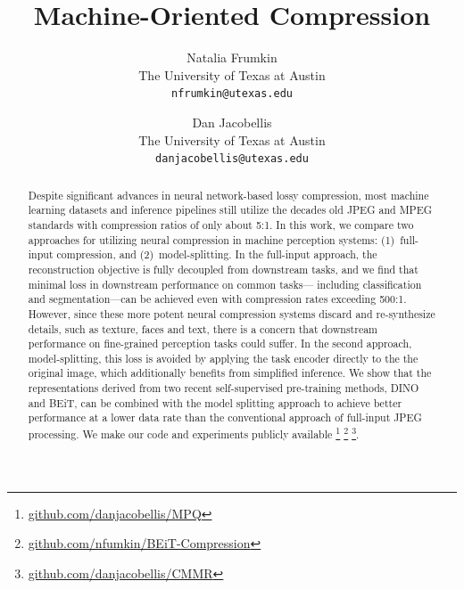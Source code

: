 \documentclass[10pt,twocolumn,letterpaper]{article}
\begin{document}
\title{Machine-Oriented Compression}

\author{Natalia Frumkin\\
The University of Texas at Austin\\
{\tt\small nfrumkin@utexas.edu}
\and
Dan Jacobellis\\
The University of Texas at Austin\\
{\tt\small danjacobellis@utexas.edu}
}

\maketitle


\begin{abstract}
Despite significant advances in neural network-based lossy compression, most machine learning datasets and inference pipelines still utilize the decades old JPEG and MPEG standards with compression ratios of only about 5:1.  In this work, we compare two approaches for utilizing neural compression in machine perception systems: (1)~full-input compression, and (2)~model-splitting. In the full-input approach, the reconstruction objective is fully decoupled from downstream tasks, and we find that minimal loss in downstream performance on common tasks--- including classification and segmentation---can be achieved even with compression rates exceeding 500:1. However, since these more potent neural compression systems discard and re-synthesize details, such as texture, faces and text, there is a concern that downstream performance on fine-grained perception tasks could suffer. In the second approach, model-splitting, this loss is avoided by applying the task encoder directly to the the original image, which additionally benefits from simplified inference. We show that the representations derived from two recent self-supervised pre-training methods, DINO and BEiT, can be combined with the model splitting approach to achieve better performance at a lower data rate than the conventional approach of full-input JPEG processing. We make our code and experiments publicly available
\footnote{\href{https://github.com/danjacobellis/MPQ}{github.com/danjacobellis/MPQ}}
\footnote{\href{https://github.com/nfumkin/BEiT-compression}{github.com/nfumkin/BEiT-Compression}}
\footnote{\href{https://github.com/danjacobellis/CMMR}{github.com/danjacobellis/CMMR}}.

\end{abstract}
\end{document}
